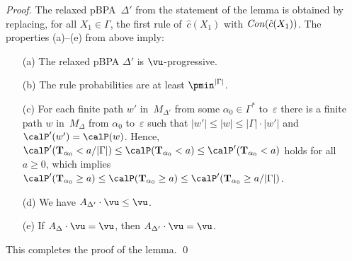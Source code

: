 \begin{proof}
The relaxed pBPA~$\Delta'$ from the statement of the lemma is obtained by replacing, for all $X_1 \in \Gamma$,
 the first rule of~$\hat c(X_1)$ with $\mathit{Con}(\hat c(X_1))$.
The properties (a)--(e) from above imply:
\begin{itemize}
 \item[(a)]
  The relaxed pBPA $\Delta'$ is $\vu$-progressive.
 \item[(b)]
  The rule probabilities are at least $\pmin^{|\Gamma|}$.
 \item[(c)]
  For each finite path $w'$ in~$M_{\Delta'}$ from some $\alpha_0 \in \Gamma^*$ to~$\varepsilon$ there is a
   finite path $w$ in~$M_{\Delta}$ from $\alpha_0$ to~$\varepsilon$ such that $|w'| \le |w| \le |\Gamma| \cdot |w'|$ and $\calP'(w') = \calP(w)$.
  Hence, $\calP'(\mathbf{T}_{\alpha_0} < a / |\Gamma|) \le \calP(\mathbf{T}_{\alpha_0} < a) \le \calP'(\mathbf{T}_{\alpha_0} < a)$ holds for all $a \ge 0$,
   which implies $\calP'(\mathbf{T}_{\alpha_0} \ge a) \le \calP( \mathbf{T}_{\alpha_0} \ge a ) \le \calP'(\mathbf{T}_{\alpha_0} \ge a / |\Gamma|)$.
 \item[(d)]
  We have $A_{\Delta'} \cdot \vu \le \vu$.
 \item[(e)]
  If $A_{\Delta} \cdot \vu = \vu$, then $A_{\Delta'} \cdot \vu = \vu$.
\end{itemize}
This completes the proof of the lemma.
\qed
\end{proof}

